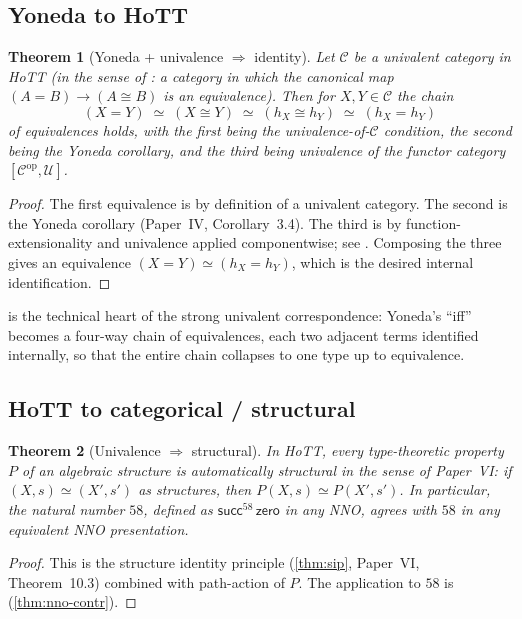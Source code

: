 \documentclass[12pt]{article}
\newtheorem{theorem}{Theorem}[section]
\theoremstyle{definition}
\theoremstyle{remark}
\newcommand{\U}{\mathcal{U}}
\newcommand{\op}{^{\mathrm{op}}}
\newcommand{\zero}{\mathsf{zero}}
\newcommand{\suc}{\mathsf{succ}}
\newcommand{\eqv}{\simeq}
\newcommand{\iso}{\cong}
\begin{document}
\subsection{Yoneda to HoTT}
\label{sec:transit-iv}

\begin{theorem}[Yoneda + univalence $\Rightarrow$ identity]
\label{thm:transit-iv}
Let $\mathcal{C}$ be a univalent category in HoTT (in the sense of
\cite[Definition~9.1.6]{HoTTBook}: a category in which the canonical map
$(A = B) \to (A \iso B)$ is an equivalence). Then for $X, Y \in \mathcal{C}$
the chain
\[
(X = Y) \;\eqv\; (X \iso Y) \;\eqv\; (h_X \iso h_Y) \;\eqv\; (h_X = h_Y)
\]
of equivalences holds, with the first being the univalence-of-$\mathcal{C}$
condition, the second being the Yoneda corollary, and the third being
univalence of the functor category $[\mathcal{C}\op, \U]$.
\end{theorem}

\begin{proof}
The first equivalence is by definition of a univalent category. The second
is the Yoneda corollary (Paper~IV, Corollary~3.4). The third is by
function-extensionality and univalence applied componentwise; see
\cite[Theorem~9.2.5]{HoTTBook}. Composing the three gives an equivalence
$(X = Y) \eqv (h_X = h_Y)$, which is the desired internal identification.
\end{proof}

 is the technical heart of the strong univalent
correspondence: Yoneda's ``iff'' becomes a four-way chain of equivalences,
each two adjacent terms identified internally, so that the entire chain
collapses to one type up to equivalence.

\subsection{HoTT to categorical / structural}
\label{sec:transit-vi}

\begin{theorem}[Univalence $\Rightarrow$ structural]
\label{thm:transit-vi}
In HoTT, every type-theoretic property $P$ of an algebraic structure is
automatically structural in the sense of Paper~VI: if
$(X, s) \eqv (X', s')$ as structures, then $P(X, s) \eqv P(X', s')$. In
particular, the natural number $58$, defined as $\suc^{58}\,\zero$ in any
NNO, agrees with $58$ in any equivalent NNO presentation.
\end{theorem}

\begin{proof}
This is the structure identity principle (\cref{thm:sip}, Paper~VI,
Theorem~10.3) combined with path-action of $P$. The application to $58$
is \cite[Corollary~5.4]{paper-v} (\cref{thm:nno-contr}).
\end{proof}
\end{document}
